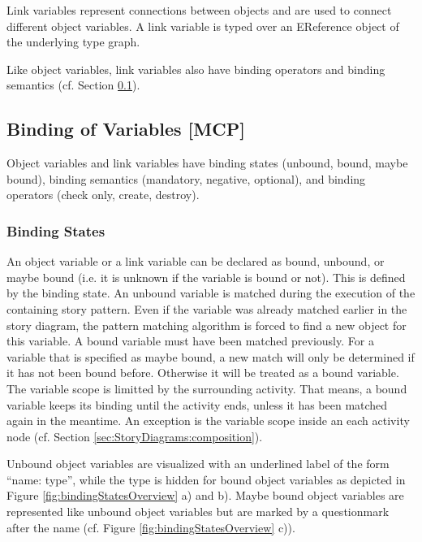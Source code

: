 Link variables represent connections between objects and are used to connect
different object variables. A link variable is typed over an EReference object of the underlying
type graph.

Like object variables, link variables also have binding
operators and binding semantics (cf. Section \ref{sec:StoryPatterns:binding}).




\subsection{Binding of Variables [MCP]}
\label{sec:StoryPatterns:binding}

Object variables and link variables have binding states (unbound, bound, maybe
bound), binding semantics (mandatory, negative, optional), and binding operators
(check only, create, destroy).


\subsubsection{Binding States}
\label{sec:StoryPatterns:binding:states}
An object variable or a link variable can be declared as bound, unbound, or
maybe bound (i.e. it is unknown if the variable is bound or not). This is
defined by the binding state. An unbound variable is matched during the
execution of the containing story pattern. 
Even if the variable was already matched earlier in the story diagram, the
pattern matching algorithm is forced to find a new object for this variable.
A bound variable must have been matched previously. 
For a variable that is specified as maybe bound, a new match will only be
determined if it has not been bound before. 
Otherwise it will be treated as a bound variable.
The variable scope is limitted by the surrounding activity. 
That means, a bound variable keeps its binding until the activity ends, unless
it has been matched again in the meantime.
An exception is the variable scope inside an each activity node (cf. Section
\ref{sec:StoryDiagrams:composition}).

Unbound object variables are visualized with an underlined label of the form
``name: type'', while the type is hidden for bound object variables as depicted
in Figure \ref{fig:bindingStatesOverview} a) and b).
Maybe bound object variables are represented like unbound object variables but
are marked by a questionmark after the name (cf. Figure
\ref{fig:bindingStatesOverview} c)).

